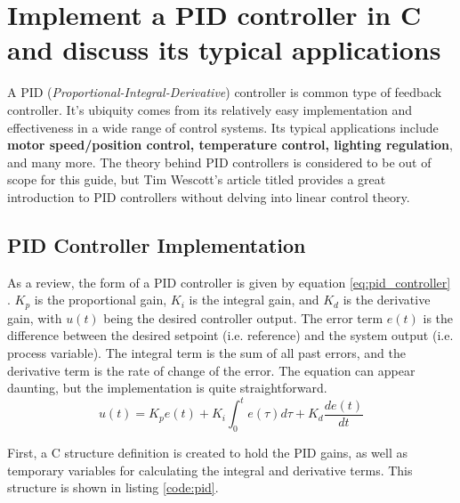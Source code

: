 \documentclass[main.tex]{subfiles}
\begin{document}
\section{Implement a PID controller in C and discuss its typical applications}

\spoilerline

\noindent A PID (\textit{Proportional-Integral-Derivative}) controller is common type of feedback controller. It's ubiquity comes from its relatively easy implementation and effectiveness in a wide range of control systems. Its typical applications include \textbf{motor speed/position control, temperature control, lighting regulation}, and many more. The theory behind PID controllers is considered to be out of scope for this guide, but Tim Wescott's article titled  provides a great introduction to PID controllers without delving into linear control theory.

\subsection{PID Controller Implementation}
As a review, the form of a PID controller is given by equation \eqref{eq:pid_controller} \cite{AbramovitchPID}. $K_p$ is the proportional gain, $K_i$ is the integral gain, and $K_d$ is the derivative gain, with $u(t)$ being the desired controller output. The error term $e(t)$ is the difference between the desired setpoint (i.e. reference) and the system output (i.e. process variable). The integral term is the sum of all past errors, and the derivative term is the rate of change of the error. The equation can appear daunting, but the implementation is quite straightforward.
\begin{equation}
    u(t) = K_p e(t) + K_i \int_{0}^{t} e(\tau) d\tau + K_d \frac{de(t)}{dt}
    \label{eq:pid_controller}
\end{equation}

\noindent First, a C structure definition is created to hold the PID gains, as well as temporary variables for calculating the integral and derivative terms. This structure is shown in listing \ref{code:pid}.

\end{document}

